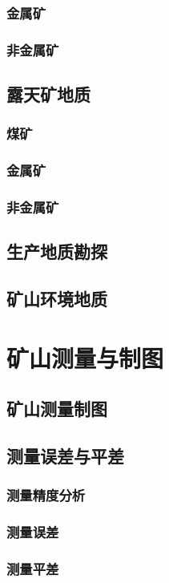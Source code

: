\documentclass[UTF8]{../../ApplicationUniverse}
\begin{document}
        \subsubsection{金属矿}
        \subsubsection{非金属矿}
    \subsection{露天矿地质}
        \subsubsection{煤矿}
        \subsubsection{金属矿}
        \subsubsection{非金属矿}
    \subsection{生产地质勘探}
    \subsection{矿山环境地质}
\section{矿山测量与制图}
    \subsection{矿山测量制图}
    \subsection{测量误差与平差}
        \subsubsection{测量精度分析}
        \subsubsection{测量误差}
        \subsubsection{测量平差}
\end{document}
